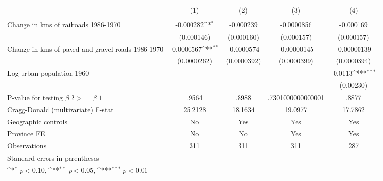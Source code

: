{
\def\sym#1{\ifmmode^{#1}\else\(^{#1}\)\fi}
\begin{tabular}{l*{4}{c}}
\hline\hline
                &\multicolumn{1}{c}{(1)}&\multicolumn{1}{c}{(2)}&\multicolumn{1}{c}{(3)}&\multicolumn{1}{c}{(4)}\\
                &\multicolumn{1}{c}{}&\multicolumn{1}{c}{}&\multicolumn{1}{c}{}&\multicolumn{1}{c}{}\\
\hline
Change in kms of railroads 1986-1970&-0.000282\sym{*}  &-0.000239         &-0.0000856         &-0.000169         \\
                &(0.000146)         &(0.000160)         &(0.000157)         &(0.000157)         \\
[1em]
Change in kms of paved and gravel roads 1986-1970&-0.0000567\sym{**} &-0.0000574         &-0.00000145         &-0.00000139         \\
                &(0.0000262)         &(0.0000392)         &(0.0000399)         &(0.0000394)         \\
[1em]
Log urban population 1960&                  &                  &                  &  -0.0113\sym{***}\\
                &                  &                  &                  &(0.00230)         \\
\hline
P-value for testing $\beta\_{2} >= \beta\_{1}$&    .9564         &    .8988         &.7301000000000001         &    .8877         \\
Cragg-Donald (multivariate) F-stat&  25.2128         &  18.1634         &  19.0977         &  17.7862         \\
Geographic controls&       No         &      Yes         &      Yes         &      Yes         \\
Province FE     &       No         &       No         &      Yes         &      Yes         \\
Observations    &      311         &      311         &      311         &      287         \\
\hline\hline
\multicolumn{5}{l}{\footnotesize Standard errors in parentheses}\\
\multicolumn{5}{l}{\footnotesize \sym{*} \(p<0.10\), \sym{**} \(p<0.05\), \sym{***} \(p<0.01\)}\\
\end{tabular}
}
